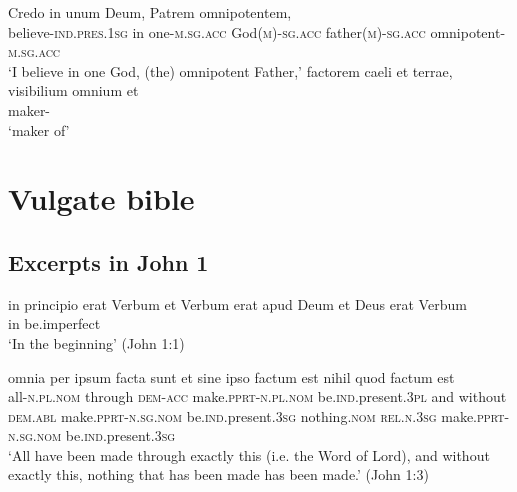 \documentclass[a4paper, oneside, 12pt]{report}
\newcommand*{\category}[1]{\textsc{#1}}
\newcommand{\translate}[1]{`#1'}
\begin{document}
\begin{exe}
    \ex \gll Credo in unum Deum, Patrem omnipotentem, \\
    believe-\category{ind}.\category{pres}.\category{1sg} in 
    one-\category{m}.\category{sg}.\category{acc} 
    God(\category{m})-\category{sg}.\category{acc} 
    father(\category{m})-\category{sg}.\category{acc}
    omnipotent-\category{m}.\category{sg}.\category{acc} \\
    \glt \translate{I believe in one God, (the) omnipotent Father,} 
    \ex \gll factorem caeli et terrae, visibilium omnium et \\ 
    maker- \\
    \glt \translate{maker of}
\end{exe}

\section{Vulgate bible}

\subsection{Excerpts in John 1}\label{sec:text.vulgate.john}

\begin{exe}
    \ex\label{ex:text.john.1.1} 
    \gll in principio erat Verbum et Verbum erat apud Deum et Deus erat Verbum \\
    in {} be.\acs{imperfect}  \\
    \glt \translate{In the beginning} (John 1:1)
    
    \ex\label{ex:text.john.1.3}
    \gll omnia per ipsum facta sunt 
    et sine ipso factum est nihil quod factum est \\
    all-\category{n}.\category{pl}.\category{nom} through \category{dem}-\category{acc}
    make.\category{pprt}-\category{n}.\category{pl}.\category{nom} 
    be.\category{ind}.\acs{present}.\category{3pl} 
    and without \category{dem}.\category{abl} 
    make.\category{pprt}-\category{n}.\category{sg}.\category{nom} 
    be.\category{ind}.\acs{present}.\category{3sg}
    nothing.\category{nom}
    \category{rel}.\category{n}.\category{3sg}
    make.\category{pprt}-\category{n}.\category{sg}.\category{nom} 
    be.\category{ind}.\acs{present}.\category{3sg} \\
    \glt \translate{All have been made through exactly this (i.e. the Word of Lord),
    and without exactly this, nothing that has been made has been made.} (John 1:3)
\end{exe}
\end{document}
